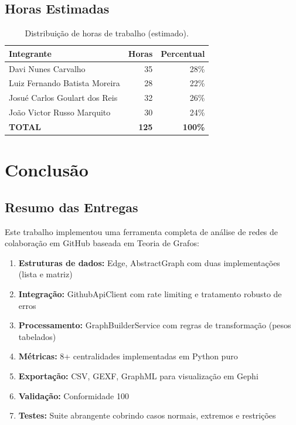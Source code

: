 \documentclass[12pt,a4paper]{article}
\begin{document}
\subsection{Horas Estimadas}

\begin{table}[h]
  \centering
  \caption{Distribuição de horas de trabalho (estimado).}
  \label{tab:horas}
  \begin{tabular}{l|r|r}
    \toprule
    \textbf{Integrante} & \textbf{Horas} & \textbf{Percentual} \\
    \midrule
    Davi Nunes Carvalho & 35 & 28\% \\
    Luiz Fernando Batista Moreira & 28 & 22\% \\
    Josué Carlos Goulart dos Reis & 32 & 26\% \\
    João Victor Russo Marquito & 30 & 24\% \\
    \midrule
    \textbf{TOTAL} & \textbf{125} & \textbf{100\%} \\
    \bottomrule
  \end{tabular}
\end{table}

\section{Conclusão}\label{sec:conclusao}

\subsection{Resumo das Entregas}

Este trabalho implementou uma ferramenta completa de análise de redes de colaboração em GitHub baseada em Teoria de Grafos:

\begin{enumerate}
  \item \textbf{Estruturas de dados:} Edge, AbstractGraph com duas implementações (lista e matriz)
  \item \textbf{Integração:} GithubApiClient com rate limiting e tratamento robusto de erros
  \item \textbf{Processamento:} GraphBuilderService com regras de transformação (pesos tabelados)
  \item \textbf{Métricas:} 8+ centralidades implementadas em Python puro
  \item \textbf{Exportação:} CSV, GEXF, GraphML para visualização em Gephi
  \item \textbf{Validação:} Conformidade 100%
  \item \textbf{Testes:} Suite abrangente cobrindo casos normais, extremos e restrições
\end{enumerate}
\end{document}
